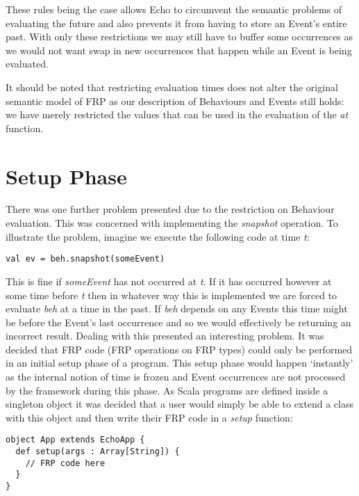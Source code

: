     These rules being the case allows Echo to circumvent the semantic problems of evaluating the future
    and also prevents it from having to store an Event's entire past. With only these restrictions we may still have to
    buffer some occurrences as we would not want swap in new occurrences that happen while an Event is being evaluated.
    
    It should be noted that restricting evaluation times does not alter the original semantic model of FRP as our description
    of Behaviours and Events still holds: we have merely restricted the values that can be used in the evaluation of the
    \emph{at} function.
    
    \section{Setup Phase}
      There was one further problem presented due to the restriction on Behaviour evaluation. This was concerned with
      implementing the \emph{snapshot} operation. To illustrate the problem, imagine we execute the following code
      at time \emph{t}:

\begin{verbatim}
val ev = beh.snapshot(someEvent)
\end{verbatim}

      This is fine if \emph{someEvent} has not occurred at \emph{t}. If it has occurred however at some time
      before \emph{t} then in whatever way this is implemented we are forced to evaluate \emph{beh}
      at a time in the past. If \emph{beh} depends on any Events this time might be before the Event's
      last occurrence and so we would effectively be returning an incorrect result. Dealing with this
      presented an interesting problem. It was decided that FRP
      code (FRP operations on FRP types) could only be performed in an initial setup phase of a program.
      This setup phase would happen `instantly' as the internal notion of time is frozen and Event
      occurrences are not processed by the framework during this phase. As Scala programs are defined inside a singleton
      object it was decided that a user would simply be able to extend a class with this object and then
      write their FRP code in a \emph{setup} function:

\begin{verbatim}
object App extends EchoApp {
  def setup(args : Array[String]) {
    // FRP code here
  }
}
\end{verbatim}
  
